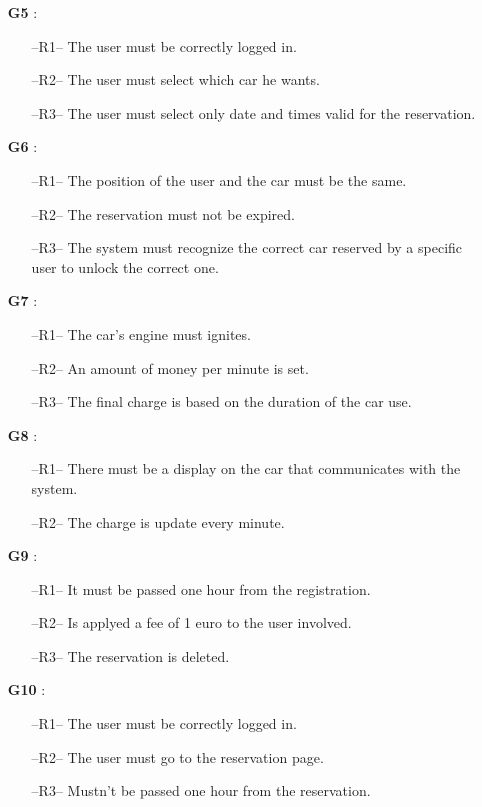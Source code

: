 \begin{itemize}
\item[\textbf{G5}]:
\begin{itemize}
\item[--R1--] The user must be correctly logged in.
\item[--R2--] The user must select which car he wants.
\item[--R3--] The user must select only date and times valid for the reservation.
\end{itemize}

\item[\textbf{G6}]:
\begin{itemize}
\item[--R1--] The position of the user and the car must be the same.
\item[--R2--] The reservation must not be expired.
\item[--R3--] The system must recognize the correct car reserved by a specific user to unlock the correct one.
\end{itemize}

\item[\textbf{G7}]:
\begin{itemize}
\item[--R1--] The car's engine must ignites.
\item[--R2--] An amount of money per minute is set.
\item[--R3--] The final charge is based on the duration of the car use.
\end{itemize}

\item[\textbf{G8}]:
\begin{itemize}
\item[--R1--] There must be a display on the car that communicates with the system.
\item[--R2--] The charge is update every minute.
\end{itemize}

\item[\textbf{G9}]:
\begin{itemize}
\item[--R1--] It must be passed one hour from the registration.
\item[--R2--] Is applyed a fee of 1 euro to the user involved.
\item[--R3--] The reservation is deleted.
\end{itemize}

\item[\textbf{G10}]:
\begin{itemize}
\item[--R1--] The user must be correctly logged in.
\item[--R2--] The user must go to the reservation page.
\item[--R3--] Mustn't be passed one hour from the reservation.
\end{itemize}


\end{itemize}
